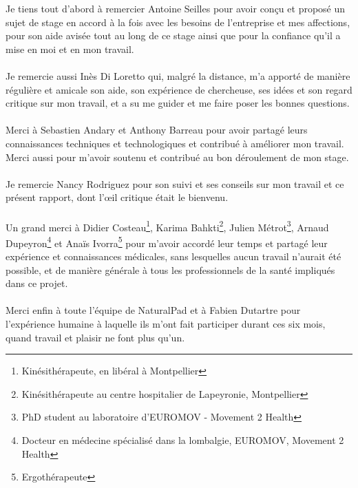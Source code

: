 Je tiens tout d'abord à remercier Antoine Seilles pour avoir conçu et proposé un sujet de stage en accord à la fois avec les besoins de l'entreprise et mes affections, pour son aide avisée tout au long de ce stage ainsi que pour la confiance qu'il a mise en moi et en mon travail.

\paragraph{}Je remercie aussi Inès Di Loretto qui, malgré la distance, m'a apporté de manière régulière et amicale son aide, son expérience de chercheuse, ses idées et son regard critique sur mon travail, et a su me guider et me faire poser les bonnes questions.

\paragraph{}Merci à Sebastien Andary et Anthony Barreau pour avoir partagé leurs connaissances techniques et technologiques et contribué à améliorer mon travail. Merci aussi pour m'avoir soutenu et contribué au bon déroulement de mon stage.

\paragraph{}Je remercie Nancy Rodriguez pour son suivi et ses conseils sur mon travail et ce présent rapport, dont l'œil critique était le bienvenu.

\paragraph{}Un grand merci à Didier Costeau\footnote{Kinésithérapeute, en libéral à Montpellier}, Karima Bahkti\footnote{Kinésithérapeute au centre hospitalier de Lapeyronie, Montpellier}, Julien Métrot\footnote{PhD student au laboratoire d'EUROMOV - Movement 2 Health}, Arnaud Dupeyron\footnote{Docteur en médecine spécialisé dans la lombalgie, EUROMOV, Movement 2 Health} et Anaïs Ivorra\footnote{Ergothérapeute} pour m'avoir accordé leur temps et partagé leur expérience et connaissances médicales, sans lesquelles aucun travail n'aurait été possible, et de manière générale à tous les professionnels de la santé impliqués dans ce projet.

\paragraph{}Merci enfin à toute l'équipe de NaturalPad et à Fabien Dutartre pour l'expérience humaine à laquelle ils m'ont fait participer durant ces six mois, quand travail et plaisir ne font plus qu'un.
